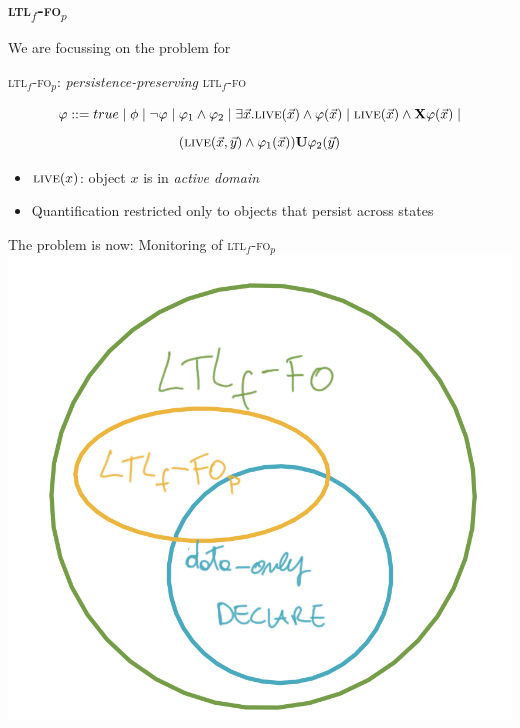 \documentclass[xcolor=dvipsnames,aspectratio=169]{beamer}
\newcommand{\nextX}{\mathbf{X}\xspace}
\newcommand{\ltlX}{\nextX}
\newcommand{\ltlU}{\mathbf{U}}
\newcommand{\true}{true}
\newcommand{\live}{\textsc{live}}
\newcommand{\ltlf}{\textsc{ltl}$_f$\xspace}
\newcommand{\ltlffo}{\ltlf-\textsc{fo}\xspace}
\newcommand{\ltlffop}{\ltlf-\textsc{fo}$_p$\xspace}
\begin{document}


\begin{frame}
\frametitle{\ltlffop}

We are focussing on the problem for 
\begin{center}
	\ltlffop: \emph{persistence-preserving} \ltlffo
\end{center}
\[\varphi ::= \true \mid \phi \mid \lnot \varphi \mid \varphi_1 \land \varphi_2 \mid 
\exists \vec x.\live(\vec x)\land\varphi(\vec x) \mid
\live(\vec x)\land \ltlX\varphi(\vec x)  \mid\]
\[(\live(\vec x, \vec y)\land \varphi_1(\vec x)) \ltlU \varphi_2(\vec y)\]
\begin{itemize}	
	\item $\live(x)$: object $x$ is in \emph{active domain}
	\item Quantification restricted only to objects that persist across states
\end{itemize}

The problem is now: Monitoring of  \ltlffop \includegraphics[scale=.2]{figures/ltlp-declare}

\end{frame}

\end{document}

